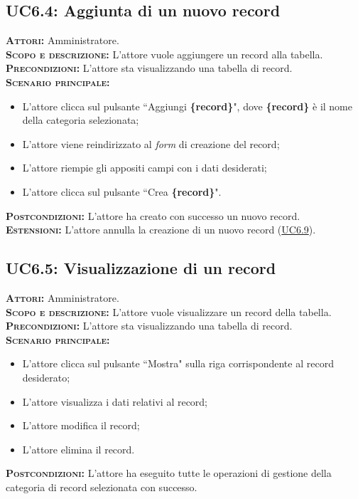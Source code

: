 \subsection{UC6.4: Aggiunta di un nuovo record}
\label{sec:UC64}
\textsc{\textbf{Attori:}} Amministratore.\\
\textsc{\textbf{Scopo e descrizione:}} L'attore vuole aggiungere un record alla tabella.\\
\textsc{\textsc{\textbf{Precondizioni:}}} L'attore sta visualizzando una tabella di record.\\
\textsc{\textbf{Scenario principale:}} 
\begin{itemize}
    \item L'attore clicca sul pulsante ``Aggiungi \textbf{\{record\}}", dove \textbf{\{record\}} è il nome della categoria selezionata;
    \item L'attore viene reindirizzato al \textit{form} di creazione del record;
    \item L'attore riempie gli appositi campi con i dati desiderati;
    \item L'attore clicca sul pulsante ``Crea \textbf{\{record\}}".
\end{itemize}
\textsc{\textbf{Postcondizioni:}} L'attore ha creato con successo un nuovo record.\\
\textsc{\textbf{Estensioni:}} L'attore annulla la creazione di un nuovo record (\hyperref[sec:UC69]{UC6.9}).

\subsection{UC6.5: Visualizzazione di un record}
\label{sec:UC65}
\textsc{\textbf{Attori:}} Amministratore.\\
\textsc{\textbf{Scopo e descrizione:}} L'attore vuole visualizzare un record della tabella.\\
\textsc{\textsc{\textbf{Precondizioni:}}} L'attore sta visualizzando una tabella di record.\\
\textsc{\textbf{Scenario principale:}} 
\begin{itemize}
    \item L'attore clicca sul pulsante ``Mostra" sulla riga corrispondente al record desiderato;
    \item L'attore visualizza i dati relativi al record;
    \item L'attore modifica il record;
    \item L'attore elimina il record.
\end{itemize}
\textsc{\textbf{Postcondizioni:}} L'attore ha eseguito tutte le operazioni di gestione della categoria di record selezionata con successo.

